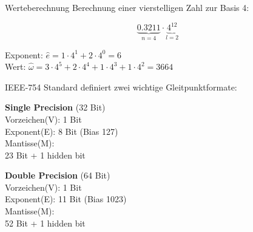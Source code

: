 \begin{example2}{Werteberechnung} Berechnung einer vierstelligen Zahl zur Basis 4:
    \vspace{-2mm}\\
    \begin{minipage}{0.3\textwidth}
        $$\underbrace{0.3211}_{n=4} \cdot \underbrace{4^{12}}_{l=2}$$
    \end{minipage}
    \begin{minipage}[t]{0.65\textwidth}
        Exponent: $\hat{e} = 1 \cdot 4^1 + 2 \cdot 4^0 = 6$ \vspace{1mm}\\
        Wert: $\hat{\omega} = 3 \cdot 4^5 + 2 \cdot 4^4 + 1 \cdot 4^3 + 1 \cdot 4^2 = 3664$
    \end{minipage}
\end{example2}



\begin{concept}{IEEE-754 Standard} definiert zwei wichtige Gleitpunktformate:
\vspace{1mm}\\
\begin{minipage}[t]{0.5\textwidth}
    \textbf{Single Precision} (32 Bit)\\
    Vorzeichen(V): 1 Bit\\
    Exponent(E): 8 Bit (Bias 127)\\
    Mantisse(M): \\ 23 Bit + 1 hidden bit
\end{minipage}
\begin{minipage}[t]{0.48\textwidth}
    \textbf{Double Precision} (64 Bit)\\
    Vorzeichen(V): 1 Bit\\
    Exponent(E): 11 Bit (Bias 1023)\\
    Mantisse(M): \\ 52 Bit + 1 hidden bit
\end{minipage}
\end{concept}


